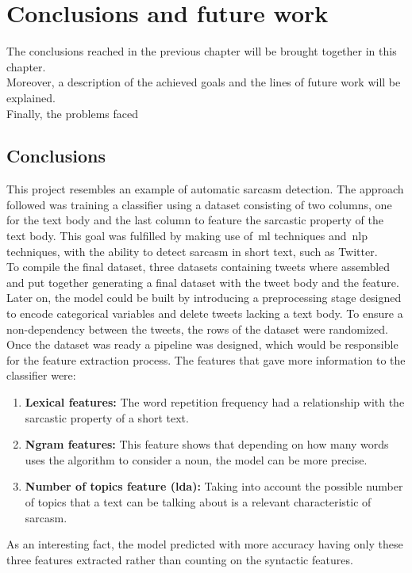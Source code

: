 \chapter{Conclusions and future work}
\label{chap:conclusions}
The conclusions reached in the previous chapter will be brought together in this chapter.\\
Moreover, a description of the achieved goals and the lines of future work will be explained.\\
Finally, the problems faced

\section{Conclusions}
\label{sec:conclusions}
This project resembles an example of automatic sarcasm detection. The approach followed was training a classifier using a dataset consisting of two columns, one for the text body and the last column to feature the sarcastic property of the text body. This goal was fulfilled by making use of~\ac{ml} techniques and~\ac{nlp} techniques, with the ability to detect sarcasm in short text, such as Twitter.\\
To compile the final dataset, three datasets containing tweets where assembled and put together generating a final dataset with the tweet body and the feature.\\
Later on, the model could be built by introducing a preprocessing stage designed to encode categorical variables and delete tweets lacking a text body. To ensure a non-dependency between the tweets, the rows of the dataset were randomized.\\
Once the dataset was ready a pipeline was designed, which would be responsible for the feature extraction process. The features that gave more information to the classifier were:
\begin{enumerate}
	\item \textbf{Lexical features:} The word repetition frequency had a relationship with the sarcastic property of a short text.
	\item \textbf{Ngram features:} This feature shows that depending on how many words uses the algorithm to consider a noun, the model can be more precise.
	\item \textbf{Number of topics feature (\ac{lda}):} Taking into account the possible number of topics that a text can be talking about is a relevant characteristic of sarcasm.
\end{enumerate} 
As an interesting fact, the model predicted with more accuracy having only these three features extracted rather than counting on the syntactic features.\\
